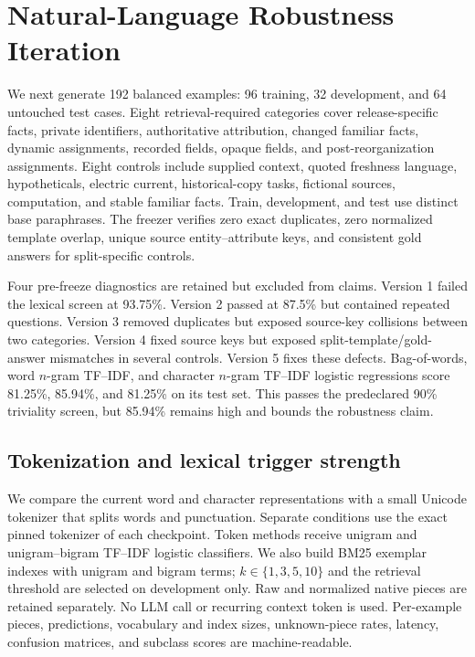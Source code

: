 \documentclass[11pt]{article}
\begin{document}
\section{Natural-Language Robustness Iteration}
We next generate 192 balanced examples: 96 training, 32 development, and 64
untouched test cases. Eight retrieval-required categories cover release-specific
facts, private identifiers, authoritative attribution, changed familiar facts,
dynamic assignments, recorded fields, opaque fields, and post-reorganization
assignments. Eight controls include supplied context, quoted freshness language,
hypotheticals, electric current, historical-copy tasks, fictional sources,
computation, and stable familiar facts. Train, development, and test use distinct
base paraphrases. The freezer verifies zero exact duplicates, zero normalized
template overlap, unique source entity--attribute keys, and consistent gold
answers for split-specific controls.

Four pre-freeze diagnostics are retained but excluded from claims. Version 1
failed the lexical screen at 93.75\%. Version 2 passed at 87.5\% but contained
repeated questions. Version 3 removed duplicates but exposed source-key
collisions between two categories. Version 4 fixed source keys but exposed
split-template/gold-answer mismatches in several controls. Version 5 fixes these
defects. Bag-of-words,
word $n$-gram TF--IDF, and character $n$-gram TF--IDF logistic regressions score
81.25\%, 85.94\%, and 81.25\% on its test set. This passes the predeclared 90\%
triviality screen, but 85.94\% remains high and bounds the robustness claim.

\subsection{Tokenization and lexical trigger strength}

We compare the current word and character representations with a small Unicode
tokenizer that splits words and punctuation. Separate conditions use the exact
pinned tokenizer of each checkpoint. Token methods receive unigram and
unigram--bigram TF--IDF logistic classifiers. We also build BM25 exemplar
indexes with unigram and bigram terms; $k\in\{1,3,5,10\}$ and the retrieval
threshold are selected on development only. Raw and normalized native pieces
are retained separately. No LLM call or recurring context token is used.
Per-example pieces, predictions, vocabulary and index sizes, unknown-piece
rates, latency, confusion matrices, and subclass scores are machine-readable.
\end{document}
